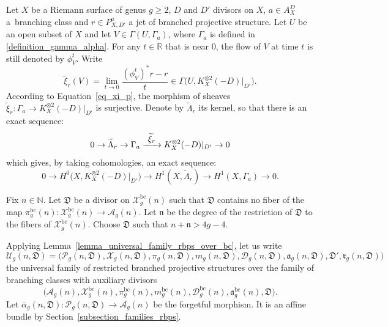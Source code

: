 \documentclass[10pt]{amsart}
\newcommand\To[1]{\mathchoice{\xrightarrow{\textstyle\kern4pt#1\kern3pt}}{\stackrel{#1}{\longrightarrow}}{}{}}
\newcommand{\N}{\mathbb N}
\newcommand{\R}{\mathbb R}
\newcommand{\BC}{\mathrm{bc}}
\theoremstyle{definition}
\theoremstyle{plain}
\begin{document}
Let $X$ be a Riemann surface of genus $g \ge 2$, $D$ and $D'$ divisors on $X$, $a \in A_X^D$ a~branching class and $r \in P_{X, D'}^a$ a jet of branched projective structure.
Let $U$ be an open subset of $X$ and let $V \in\Gamma(U, \Gamma_a)$, where $\Gamma_a$ is defined in \eqref{definition_gamma_alpha}.
For any $t \in \R$ that is near $0$, the flow of $V$ at time $t$ is still denoted by $\phi^t_V$.
Write
\begin{equation*}
\widetilde \xi_r(V) = \lim_{t \to 0} \frac{(\phi^t_V)^*r - r}t \in \Gamma\bigl(U, K_X^{\otimes 2}(-D)|_{D'}\bigr).
\end{equation*}
According to Equation~\ref{eq_xi_p}, the morphism of sheaves $\widetilde \xi_r: \Gamma_a \to K_X^{\otimes 2}(-D)|_{D'}$ is surjective.
Denote by $\widetilde \Lambda_r$ its kernel, so that there is an exact sequence:
\begin{equation*}
0 \to \widetilde \Lambda_r \to \Gamma_a \To{\widetilde \xi_r} K_X^{\otimes 2}(-D)|_{D'} \to 0
\end{equation*}
which gives, by taking cohomologies, an exact sequence:
\begin{equation}\label{eq_exact_cohom_classes_jets}
0 \to H^0\bigl(X, K_X^{\otimes 2}(-D)|_{D'}\bigr) \to H^1(X, \widetilde \Lambda_r) \to H^1(X, \Gamma_a) \to 0.
\end{equation}

Fix $n \in \N$.
Let $\mathfrak D$ be a divisor on $\mathcal X_g^{\BC}(n)$ such that $\mathfrak D$ contains no fiber of the map $\pi_g^{\BC}(n): \mathcal X_g^{\BC}(n) \to \mathcal A_g(n)$.
Let $\mathfrak n$ be the degree of the restriction of $\mathfrak D$ to the fibers of $\mathcal X_g^{\BC}(n)$.
Choose $\mathfrak D$ such that $n + \mathfrak n > 4g-4$.

Applying Lemma~\ref{lemma_universal_family_rbps_over_bc}, let us write
\[
\mathcal U_g(n, \mathfrak D) = \bigl(\mathcal P_g(n, \mathfrak D), \mathcal X_g(n, \mathfrak D), \pi_g(n, \mathfrak D), m_g(n, \mathfrak D), \mathcal D_g(n, \mathfrak D), \mathfrak a_g(n, \mathfrak D), \mathfrak D', \mathfrak r_g(n, \mathfrak D)\bigr)
\]
the universal family of restricted branched projective structures over the family of branching classes with auxiliary divisors
\[
\bigl(\mathcal A_g(n), \mathcal X_g^{\BC}(n), \pi_g^{\BC}(n), m_g^{\BC}(n), \mathcal D_g^{\BC}(n), \mathfrak a_g^{\BC}(n), \mathfrak D\bigr).
\]
Let $\overline \alpha_g(n, \mathfrak D): \mathcal P_g(n, \mathfrak D) \to \mathcal A_g(n)$ be the forgetful morphism.
It is an affine bundle by Section~\ref{subsection_families_rbps}.
\end{document}
